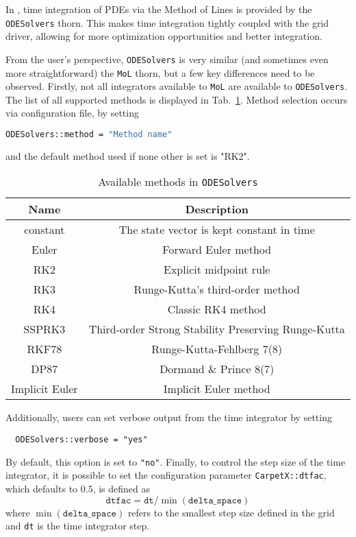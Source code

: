 In \CarpetX, time integration of PDEs via the Method of Lines is provided by the \texttt{ODESolvers} thorn. This makes time integration tightly coupled with the grid driver, allowing for more optimization opportunities and better integration.

From the user's perspective, \texttt{ODESolvers} is very similar (and sometimes even more straightforward) the \texttt{MoL} thorn, but a few key differences need to be observed. Firstly, not all integrators available to \texttt{MoL} are available to \texttt{ODESolvers}. The list of all supported methods is displayed in Tab.~\ref{tab:odesolvers_methods}. Method selection occurs via configuration file, by setting
%
\begin{lstlisting}[language=bash]
  ODESolvers::method = "Method name"
\end{lstlisting}
%
and the default method used if none other is set is "RK2".

\begin{table}[hb]
  \centering
  \begin{tabular}{cc}
  Name           & Description                                         \\ \hline\hline
  constant       & The state vector is kept constant in time           \\
  Euler          & Forward Euler method                                \\
  RK2            & Explicit midpoint rule                              \\
  RK3            & Runge-Kutta's third-order method                    \\
  RK4            & Classic RK4 method                                  \\
  SSPRK3         & Third-order Strong Stability Preserving Runge-Kutta \\
  RKF78          & Runge-Kutta-Fehlberg 7(8)                           \\
  DP87           & Dormand \& Prince 8(7)                              \\
  Implicit Euler & Implicit Euler method                               \\ \hline\hline
  \end{tabular}
  \caption{Available methods in \texttt{ODESolvers}}
  \label{tab:odesolvers_methods}
\end{table}

Additionally, users can set verbose output from the time integrator by setting
%
\begin{lstlisting}
  ODESolvers::verbose = "yes"
\end{lstlisting}
%
By default, this option is set to \texttt{"no"}. Finally, to control the step size of the time integrator, it is possible to set the configuration parameter \texttt{CarpetX::dtfac}, which defaults to $0.5$, is defined as
%
\begin{equation}
  \texttt{dtfac} = \texttt{dt}/\min(\texttt{delta\_space})
\end{equation}
%
where $\min(\texttt{delta\_space})$ refers to the smallest step size defined in the \CarpetX\space grid and \texttt{dt} is the time integrator step.

